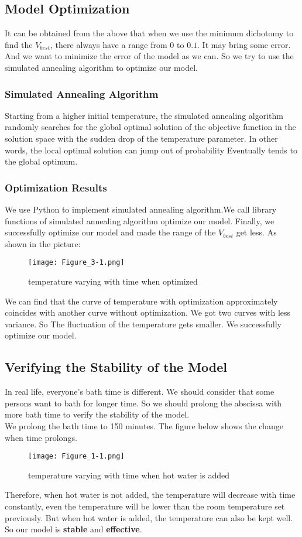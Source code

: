 \documentclass{mcmthesis}
\begin{document}
\subsection{Model Optimization}
\indent It can be obtained from the above that when we use the minimum dichotomy to find the $V_{best}$,  there always have a range from $0$ to $0.1$. It may bring some error. And we want to minimize the error of the model as we can. So we try to use the simulated annealing algorithm to optimize our model. 
\subsubsection{Simulated Annealing Algorithm}
\indent Starting from a higher initial temperature, the simulated annealing algorithm randomly searches for the global optimal solution of the objective function in the solution space with the sudden drop of the temperature parameter. In other words, the local optimal solution can jump out of probability Eventually tends to the global optimum.
\subsubsection{Optimization Results}
\indent We use Python to implement simulated annealing algorithm.We call library functions of simulated annealing algorithm optimize our model. Finally, we successfully optimize our model and made the range of the $V_{best}$ get less. As shown in the picture:
\begin{figure}[H]	%
\centerline{\texttt{[image: Figure\_3-1.png]}}
\caption{temperature varying with time when optimized}
\label{oval}	
\end{figure}
\indent We can find that the curve of temperature with optimization approximately coincides with another curve without optimization. We got two curves with less variance. So The fluctuation of the temperature gets smaller. We successfully optimize our model.
\subsection{Verifying the Stability of the Model}%
\indent In real life, everyone's bath time is different. We should consider that some persons want to bath for longer time. So we should prolong the abscissa with more bath time to verify the stability of the model.\\
\indent We prolong the bath time to 150 minutes. The figure below shows the change when time prolongs.
\begin{figure}[H]	%
\centerline{\texttt{[image: Figure\_1-1.png]}}
\caption{temperature varying with time when hot water is added}
\label{oval}	
\end{figure}
\indent Therefore, when hot water is not added, the temperature will decrease with time constantly, even the temperature will be lower than the room temperature set previously.
But when hot water is added, the temperature can also be kept well. So our model is \textbf{stable} and \textbf{effective}.
\end{document}

